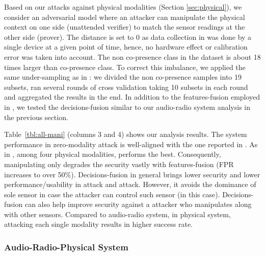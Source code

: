 Based on our attacks against physical modalities (Section \ref{sec:physical}),
we consider an adversarial model where an attacker can manipulate the physical
context on one side (unattended verifier) to match the sensor readings at the
other side (prover). 
 The distance
is set to 0 as data collection in \cite{ShresthaFC2014} was done by a single
device at a given point of time, hence, no hardware effect or calibration error
was taken into account.  The non co-presence class in the dataset is about 18
times larger than co-presence class. To correct this imbalance, we applied the
same under-sampling as in \cite{ShresthaFC2014}: we divided the non co-presence
samples into 19 subsets, ran several rounds of cross validation taking 10
subsets in each round and aggregated the results in the end. In addition to
the features-fusion employed in \cite{ShresthaFC2014}, we tested the 
decisions-fusion similar to our audio-radio system analysis in the previous section.

Table~\ref{tbl:all-mani} (columns 3 and 4) shows our analysis results.  The
system performance in zero-modality attack is well-aligned with the one
reported in \cite{ShresthaFC2014}.  As in \cite{ShresthaFC2014}, among four
physical modalities, \altitude performs the best. Consequently, manipulating
only \altitude degrades the security vastly with features-fusion (FPR increases
to over 50\%). Decisions-fusion in general brings lower security and lower
performance/usability in \zeromodal attack and \singlemodal attack.  However,
it avoids the dominance of sole sensor in case the attacker can control such
sensor (\altitude in this case). Decisions-fusion can also help improve
security against a \multimodal attacker who manipulates \altitude along with
other sensors. Compared to audio-radio system, in physical system, attacking
each single modality results in higher success rate. 















\subsubsection{Audio-Radio-Physical System}


